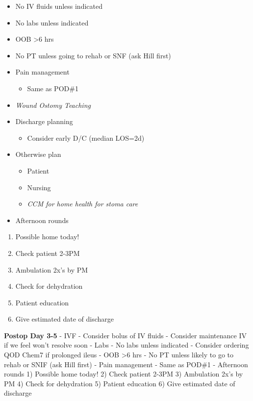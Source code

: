 \documentclass[
  letterpaper,
]{scrbook}
\providecommand{\tightlist}{%
  \setlength{\itemsep}{0pt}\setlength{\parskip}{0pt}}
\begin{document}
\begin{itemize}
\tightlist
\item
  No IV fluids unless indicated
\item
  No labs unless indicated
\item
  OOB \textgreater6 hrs
\item
  No PT unless going to rehab or SNF (ask Hill first)
\item
  Pain management

  \begin{itemize}
  \tightlist
  \item
    Same as POD\#1
  \end{itemize}
\item
  \emph{Wound Ostomy Teaching}
\item
  Discharge planning

  \begin{itemize}
  \tightlist
  \item
    Consider early D/C (median LOS=2d)
  \end{itemize}
\item
  Otherwise plan

  \begin{itemize}
  \tightlist
  \item
    Patient
  \item
    Nursing
  \item
    \emph{CCM for home health for stoma care}
  \end{itemize}
\item
  Afternoon rounds
\end{itemize}

\begin{enumerate}
\def\labelenumi{\arabic{enumi})}
\tightlist
\item
  Possible home today!
\item
  Check patient 2-3PM
\item
  Ambulation 2x's by PM
\item
  Check for dehydration
\item
  Patient education
\item
  Give estimated date of discharge
\end{enumerate}

\textbf{Postop Day 3-5} - IVF - Consider bolus of IV fluids - Consider
maintenance IV if we feel won't resolve soon - Labs - No labs unless
indicated - Consider ordering QOD Chem7 if prolonged ileus - OOB
\textgreater6 hrs - No PT unless likely to go to rehab or SNIF (ask Hill
first) - Pain management - Same as POD\#1 - Afternoon rounds 1) Possible
home today! 2) Check patient 2-3PM 3) Ambulation 2x's by PM 4) Check for
dehydration 5) Patient education 6) Give estimated date of discharge
\end{document}
